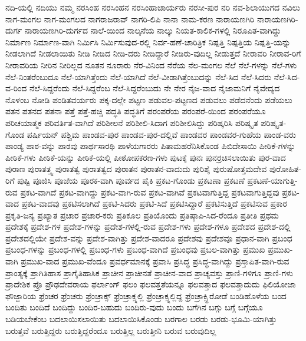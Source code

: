 {ನದಿ-ಯಲ್ಲಿ
ನದಿಯು
ನಮ್ಮ
ನರಸಿಂಹ
ನರಸಿಂಹನ
ನರಸಿಂಹಾಚಾರ್ಯರು
ನರಸೀ-ಪುರ
ನರಿ
ನವ-ಶಿಲಾಯುಗದ
ನವಿಲು
ನಾಗ-ಮಂಗಲ
ನಾಗ-ಮಂಗಲದ
ನಾಗರಾಜರಾವ್
ನಾಗರಿ-ಲಿಪಿ
ನಾನಾ
ನಾಮ-ಕರಣ
ನಾರಾಯಣಗಿರಿ
ನಾರಾಯಣಗಿರಿ-ದುರ್ಗ
ನಾರಾಯಣಗಿರಿ-ದುರ್ಗದ
ನಾಲೆ-ಯಿಂದ
ನಾಲ್ಕನೆಯ
ನಾಲ್ಕು
ನಿಯತ-ಕಾಲಿಕ-ಗಳಲ್ಲಿ
ನಿರೂಪಿತ-ವಾಗಿದ್ದು
ನಿರ್ಮಾಣ
ನಿರ್ಮಾಣ-ವಾಗಿ
ನಿರ್ಮಿಸಿ
ನಿರ್ಮಿಸುವುದ-ರಲ್ಲಿ
ನಿರ್ವ-ಹಣೆ-ಚಾರಿತ್ರಿಕ
ನಿಷ್ಪತ್ತಿ
ನಿಷ್ಪತ್ತಿಯ
ನಿಷ್ಪತ್ತಿ-ಯನ್ನು
ನೀಡಲಾಗಿದೆ
ನೀಡಲಾಯಿತು
ನೀಡಿ
ನೀಡಿದ
ನೀಡಿ-ದರು
ನೀಡಿದ್ದಾರೆ
ನೀಡಿರು-ವುದಿಲ್ಲ
ನೀಡುತ್ತದೆ
ನೀರಾವರಿ
ನೀರಾವ-ರಿಗೆ
ನೀರಾವರಿಯ
ನೀರಿನ
ನೀರಿಲ್ಲದ
ನೂತನ
ನೂರಾರು
ನೆರ-ವಿನಿಂದ
ನೆರೆಯ
ನೆಲ-ಮಂಗಲ
ನೆಲೆ
ನೆಲೆ-ಗಳನ್ನು
ನೆಲೆ-ಗಳು
ನೆಲೆ-ನಿಂತರೆಂಬುದೂ
ನೆಲೆ-ಯಾಗಿತ್ತೆಂದು
ನೆಲೆ-ಯಾಗಿದೆ
ನೆಲೆ-ವೀಡಾಗಿತ್ತೆಂಬುದನ್ನು
ನೆಲೆ-ಸಿದ
ನೆಲೆ-ಸಿದರು
ನೆಲೆ-ಸಿದ-ವ-ರಿಂದ
ನೆಲೆ-ಸಿದ್ದರೆಂದು
ನೆಲೆ-ಸಿದ್ದರೆಂಬ
ನೆಲೆ-ಸಿದ್ದರೆಂಬುದು
ನೇ
ನೇರ
ನೈಜ-ವಾದ
ನೈಜಾಮನಿಗೆ
ನೈವೇದ್ಯದ
ನೊಳಂಬ
ನೋಡಿ
ಪಂಡಿತವರ್ಯರು
ಪಕ್ಕ-ದಲ್ಲೇ
ಪಟ್ಟಣ
ಪಡುವಲ-ಪಟ್ಟಣದ
ಪಡುವಲು
ಪಡೆದನೆಂದು
ಪಡೆಯಲು
ಪತನ
ಪತನದ
ಪತನಾ
ಪತ್ತೆ
ಪತ್ತೆ-ಹಚ್ಚಿ
ಪದ್ಧತಿ
ಪದ್ಧತಿಗೆ
ಪರಂಪರೆಯ
ಪರಂಪರೆ-ಯಿಂದ
ಪರಂಪರೆಯೂ
ಪರಿಚಯಾತ್ಮಕ
ಪರಿವರ್ತಿತ-ವಾಗಿದೆ
ಪರಿಶೀಲನೆ
ಪರಿಶೀಲಿ-ಸಿದಾಗ
ಪರಿಶೀಲಿಸಿದ್ದು
ಪರಿಷ್ಕರಿಸಿ
ಪರಿಷ್ಕೃತ
ಪರಿಷ್ಕೃತ-ಗೊಂಡ
ಪರ್ಷಿಯನ್
ಪಶ್ಚಿಮ
ಪಾಂಡವ-ಪುರ
ಪಾಂಡವ-ಪುರ-ದಲ್ಲಿವೆ
ಪಾಂಡವರ
ಪಾಂಡವರ-ಗುಹೆಯ
ಪಾಂಡ-ವರು
ಪಾಂಡ್ಯ
ಪಾಠ-ವನ್ನು
ಪಾಠವು
ಪಾರ್ಥಸಾರಥಿ
ಪಾಳೆಯಗಾರರು
ಪಿತಾಮಹರೆನಿಸಿಕೊಂಡ
ಪಿಬಿದೇಸಾಯಿ
ಪೀಠಿಕೆ-ಗಳನ್ನು
ಪೀಠಿಕೆ-ಗಳು
ಪೀಠಿಕೆ-ಯನ್ನು
ಪೀಠಿಕೆ-ಯಲ್ಲಿ
ಪೀಠೋಪಕರಣ-ಗಳು
ಪುಟಕ್ಕೆ
ಪುನಃ
ಪುನರ್ರಚಿಸಲಾಯಿತು
ಪುರ-ವಾದ
ಪುರಾಣ
ಪುರಾತತ್ತ್ವ
ಪುರಾತತ್ವ
ಪುರಾತತ್ವದ
ಪುರಾತನ
ಪುರಾತನ-ವಾದುದು
ಪುರಿಶೈ
ಪುರುಷೋತ್ತಮದೇವ
ಪುರೋಹಿತ-ರಿಗೆ
ಪುಷ್ಟಿ
ಪೂಜಿಸಿ
ಪೂಜೆಯ
ಪೂರಕ-ವಾಗಿ
ಪೂರ್ವದ
ಪೈಕಿ
ಪ್ರಕಟ-ಗೊಂಡು
ಪ್ರಕಟಣಾ
ಪ್ರಕಟಣೆ
ಪ್ರಕಟಣೆ-ಯಾಗುತ್ತಿ-ರುವ
ಪ್ರಕಟ-ವಾಗಿದೆ
ಪ್ರಕಟ-ವಾಗಿದ್ದು
ಪ್ರಕಟ-ವಾಗಿ-ರುವ
ಪ್ರಕಟ-ವಾಗಿವೆ
ಪ್ರಕಟವಾಗುತ್ತಿದ್ದ
ಪ್ರಕಟವಾಗುತ್ತಿದ್ದವು
ಪ್ರಕಟ-ವಾದ
ಪ್ರಕಟ-ವಾದವು
ಪ್ರಕಟಿಸಲಾಗಿದೆ
ಪ್ರಕಟಿ-ಸಿದರು
ಪ್ರಕಟಿ-ಸಿದೆ
ಪ್ರಕಟಿಸಿದ್ದಾರೆ
ಪ್ರಕಟಿಸುತ್ತಿದೆ
ಪ್ರಕಟಿಸುವ
ಪ್ರಕಾರ
ಪ್ರಕೃತಿ-ಜನ್ಯ
ಪ್ರಖ್ಯಾತ
ಪ್ರಚಾರ
ಪ್ರಚಾರ-ಕರು
ಪ್ರತಿಕೂಲ
ಪ್ರತಿಯೊಂದು
ಪ್ರತಿಷ್ಠಾಪಿ-ಸಿದ-ರೆಂದೂ
ಪ್ರತೀತಿ
ಪ್ರಥಮ
ಪ್ರದೇಶಕ್ಕೆ
ಪ್ರದೇಶ-ಗಳ
ಪ್ರದೇಶ-ಗಳನ್ನು
ಪ್ರದೇಶ-ಗಳಲ್ಲಿ-ರುವ
ಪ್ರದೇಶ-ಗಳು
ಪ್ರದೇಶ-ಗಳೂ
ಪ್ರದೇಶದ
ಪ್ರದೇಶ-ದಲ್ಲಿ
ಪ್ರದೇಶದಲ್ಲಿಯೇ
ಪ್ರದೇಶ-ವನ್ನು
ಪ್ರದೇಶ-ವಾಗಿತ್ತು
ಪ್ರದೇಶ-ವಾದರೂ
ಪ್ರದೇಶವು
ಪ್ರದೇಶವೂ
ಪ್ರಧಾನ-ವಾಗಿ
ಪ್ರಬಂಧ
ಪ್ರಬಂಧ-ಗಳನ್ನು
ಪ್ರಬಂಧ-ಗಳಲ್ಲಿ
ಪ್ರಬಂಧ-ಗಳು
ಪ್ರಬಂಧ-ವಾಗಿದೆ
ಪ್ರಬಂಧವು
ಪ್ರಬಲ-ವಾಗಿತ್ತು
ಪ್ರಮುಖ
ಪ್ರಮುಖ-ವಾಗಿ
ಪ್ರಮುಖ-ವಾದ
ಪ್ರಮುಖ-ವೆಂದೂ
ಪ್ರವರ್ಧಮಾನಕ್ಕೆ
ಪ್ರವಾಸಿ
ಪ್ರಸಿದ್ಧ
ಪ್ರಸಿದ್ಧ-ವಾಗಿದ್ದು
ಪ್ರಸ್ತಾಪಿತ-ವಾಗಿ-ರುವ
ಪ್ರಾಂತ್ಯಕ್ಕೆ
ಪ್ರಾಗಿತಿಹಾಸ
ಪ್ರಾಗೈತಿಹಾಸಿಕ
ಪ್ರಾಚೀನ
ಪ್ರಾಚೀನತೆ
ಪ್ರಾಚೀನ-ವಾದ
ಪ್ರಾಚ್ಯವಸ್ತು
ಪ್ರಾಣಿ-ಗಳಿಗೂ
ಪ್ರಾಣಿ-ಗಳು
ಪ್ರಾದೇಶಿಕ
ಪ್ರೊ
ಪ್ರೌಢದೇವರಾಯ
ಫರ್ಲಾಂಗ್
ಫಲಂ
ಫಲವತ್ತತೆಯನ್ನೂ
ಫಲವತ್ತಾದ
ಫಲವತ್ತಾದುದು
ಫಿಲಿಯೋಜಾ
ಫೌಜ್ದಾರಿಯ
ಫ್ರೆಂಚರ
ಫ್ರೆಂಚರು
ಫ್ರೆಂಚ್ರಾಕ್ಸ್
ಫ್ರೆಂಚ್ರಾಕ್ಸ್ನಲ್ಲಿ
ಫ್ರೆಂಚ್ರಾಕ್ಸ್ನಲ್ಲಿದ್ದ
ಫ್ರೆಂಚ್ರಾಕ್ಸ್ಹಿರೋಡೆ
ಬಂಡಿಹೊಳೆಯ
ಬಂದ
ಬಂದಿತು
ಬಂದಿದೆ
ಬಂದಿದ್ದು
ಬಂದಿರ-ಬಹುದು
ಬಂದಿರು-ವುದು
ಬಂದು
ಬಗೆಗಿನ
ಬಗ್ಗು
ಬಗ್ಗೆ
ಬಗ್ಗೆಯೂ
ಬಡಿಯಬೇಕೆಂಬ
ಬದಲಾಯಿಸಲಾಯಿತು
ಬದಲಾಯಿಸಿಕೊಂಡು
ಬರಗಾಲ
ಬರಡು
ಬರಡು-ಭೂಮಿ-ಯಾಗಿತ್ತು
ಬರುತ್ತವೆ
ಬರುತ್ತಿದ್ದರು
ಬರುತ್ತಿದ್ದರೆಂದೂ
ಬರುತ್ತಿಲ್ಲ
ಬರುತ್ತೀನಿ
ಬರುವ
ಬರುವುದಿಲ್ಲ
}
